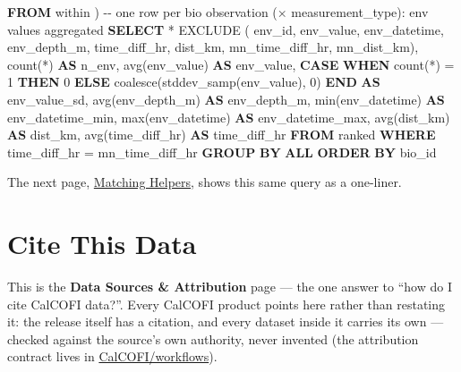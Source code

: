 \documentclass[
  letterpaper,
  DIV=11,
  numbers=noendperiod]{scrreprt}
\newenvironment{Shaded}{\begin{snugshade}}{\end{snugshade}}
\newcommand{\CommentTok}[1]{\textcolor[rgb]{0.37,0.37,0.37}{#1}}
\newcommand{\ControlFlowTok}[1]{\textcolor[rgb]{0.00,0.23,0.31}{\textbf{#1}}}
\newcommand{\DecValTok}[1]{\textcolor[rgb]{0.68,0.00,0.00}{#1}}
\newcommand{\FunctionTok}[1]{\textcolor[rgb]{0.28,0.35,0.67}{#1}}
\newcommand{\KeywordTok}[1]{\textcolor[rgb]{0.00,0.23,0.31}{\textbf{#1}}}
\newcommand{\NormalTok}[1]{\textcolor[rgb]{0.00,0.23,0.31}{#1}}
\newcommand{\OperatorTok}[1]{\textcolor[rgb]{0.37,0.37,0.37}{#1}}
\begin{document}
\begin{Shaded}
\begin{Highlighting}[]
  \KeywordTok{FROM}\NormalTok{ within}
\NormalTok{)}
\CommentTok{{-}{-} one row per bio observation (× measurement\_type): env values aggregated}
\KeywordTok{SELECT}
  \OperatorTok{*}\NormalTok{ EXCLUDE (}
\NormalTok{    env\_id, env\_value, env\_datetime, env\_depth\_m,}
\NormalTok{    time\_diff\_hr, dist\_km, mn\_time\_diff\_hr, mn\_dist\_km),}
  \FunctionTok{count}\NormalTok{(}\OperatorTok{*}\NormalTok{)                                            }\KeywordTok{AS}\NormalTok{ n\_env,}
  \FunctionTok{avg}\NormalTok{(env\_value)                                      }\KeywordTok{AS}\NormalTok{ env\_value,}
  \ControlFlowTok{CASE} \ControlFlowTok{WHEN} \FunctionTok{count}\NormalTok{(}\OperatorTok{*}\NormalTok{) }\OperatorTok{=} \DecValTok{1} \ControlFlowTok{THEN} \DecValTok{0}
       \ControlFlowTok{ELSE} \FunctionTok{coalesce}\NormalTok{(}\FunctionTok{stddev\_samp}\NormalTok{(env\_value), }\DecValTok{0}\NormalTok{) }\ControlFlowTok{END}   \KeywordTok{AS}\NormalTok{ env\_value\_sd,}
  \FunctionTok{avg}\NormalTok{(env\_depth\_m)                                    }\KeywordTok{AS}\NormalTok{ env\_depth\_m,}
  \FunctionTok{min}\NormalTok{(env\_datetime)                                   }\KeywordTok{AS}\NormalTok{ env\_datetime\_min,}
  \FunctionTok{max}\NormalTok{(env\_datetime)                                   }\KeywordTok{AS}\NormalTok{ env\_datetime\_max,}
  \FunctionTok{avg}\NormalTok{(dist\_km)                                        }\KeywordTok{AS}\NormalTok{ dist\_km,}
  \FunctionTok{avg}\NormalTok{(time\_diff\_hr)                                   }\KeywordTok{AS}\NormalTok{ time\_diff\_hr}
\KeywordTok{FROM}\NormalTok{ ranked}
\KeywordTok{WHERE}\NormalTok{ time\_diff\_hr }\OperatorTok{=}\NormalTok{ mn\_time\_diff\_hr}
\KeywordTok{GROUP} \KeywordTok{BY} \KeywordTok{ALL}
\KeywordTok{ORDER} \KeywordTok{BY}\NormalTok{ bio\_id}
\end{Highlighting}
\end{Shaded}

The next page, \href{helpers.qmd}{Matching Helpers}, shows this same
query as a one-liner.


\chapter{Cite This Data}\label{cite-this-data}

This is the \textbf{Data Sources \& Attribution} page --- the one answer
to ``how do I cite CalCOFI data?''. Every CalCOFI product points here
rather than restating it: the release itself has a citation, and every
dataset inside it carries its own --- checked against the source's own
authority, never invented (the attribution contract lives in
\href{https://github.com/CalCOFI/workflows/blob/main/CLAUDE.md}{CalCOFI/workflows}).
\end{document}
